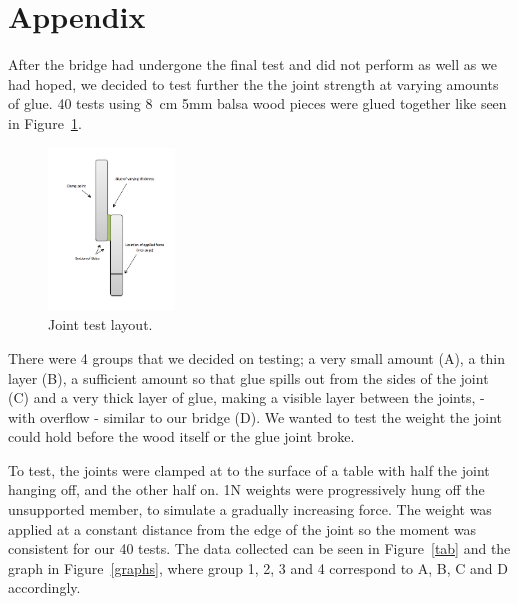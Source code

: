\documentclass[12pt]{article}
\begin{document}
\section*{Appendix}
\label{appendix}
After the bridge had undergone the final test and did not perform as well as we had hoped, we decided to test further the the joint strength at varying amounts of glue. 40 tests using 8~cm 5mm balsa wood pieces were glued together like seen in Figure~\ref{jointtesting}.
                \begin{figure}[h!]
			\centering
			\includegraphics[width=0.3\textwidth]{Jointtest}
			\caption{Joint test layout.}
			\label{jointtesting}
		\end{figure}

There were 4 groups that we decided on testing; a very small amount (A), a thin layer (B), a sufficient amount so that glue spills out from the sides of the joint (C) and a very thick layer of glue, making a visible layer between the joints, - with overflow -  similar to our bridge (D).
We wanted to test the weight the joint could hold before the wood itself or the glue joint broke.

To test, the joints were clamped at to the surface of a table with half the joint hanging off, and the other half on. 1N weights were progressively hung off  the unsupported member, to simulate a gradually increasing force. The weight was applied at a constant distance from the edge of the joint so the moment was consistent for our 40 tests.
The data collected can be seen in Figure~\ref{tab} and the graph in Figure~\ref{graphs}, where group 1, 2, 3 and 4 correspond to A, B, C and D accordingly.
		
\end{document}
